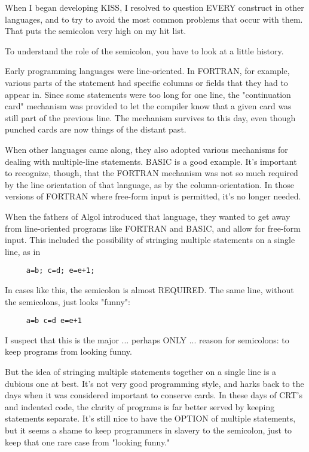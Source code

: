 When  I  began  developing  KISS, I resolved to  question  EVERY construct in other languages, and to try to avoid the most common problems that occur with them. That puts the semicolon very high on my hit list.

To  understand  the  role of the semicolon, you have to look at a little history.

Early programming languages were line-oriented. In  FORTRAN, for example, various parts  of  the statement had specific columns or fields that they had to appear in. Since  some  statements  were too  long for one line, the  "continuation  card"  mechanism  was provided to let  the  compiler  know  that a given card was still part of the previous  line. The mechanism survives to this day, even though punched cards are now things of the distant past.

When  other  languages  came  along, they  also  adopted various mechanisms for dealing with multiple-line statements. BASIC is a good  example. It's important to  recognize, though, that  the FORTRAN  mechanism  was   not   so  much  required  by  the  line orientation of that  language, as by the column-orientation. In those versions of FORTRAN  where  free-form  input  is permitted, it's no longer needed.

When the fathers  of  Algol introduced that language, they wanted to get away  from  line-oriented programs like FORTRAN and BASIC, and allow for free-form input. This included the possibility of stringing multiple statements on a single line, as in

\begin{verbatim}
     a=b; c=d; e=e+1;
\end{verbatim}

In cases like this, the  semicolon is almost REQUIRED. The same line, without the semicolons, just looks "funny":

\begin{verbatim}
     a=b c=d e=e+1
\end{verbatim}

I suspect that this is the major ... perhaps ONLY ... reason for semicolons: to keep programs from looking funny.

But  the  idea  of stringing multiple statements  together  on  a single  line  is  a  dubious  one  at  best. It's not very  good programming  style, and  harks back to  the  days  when  it  was considered important to conserve cards. In these  days  of CRT's and indented code, the clarity of programs is  far  better served by  keeping statements separate. It's still  nice  to  have  the OPTION  of  multiple  statements, but  it seems a shame to  keep programmers  in  slavery  to the semicolon, just to keep that one rare case from "looking funny."

